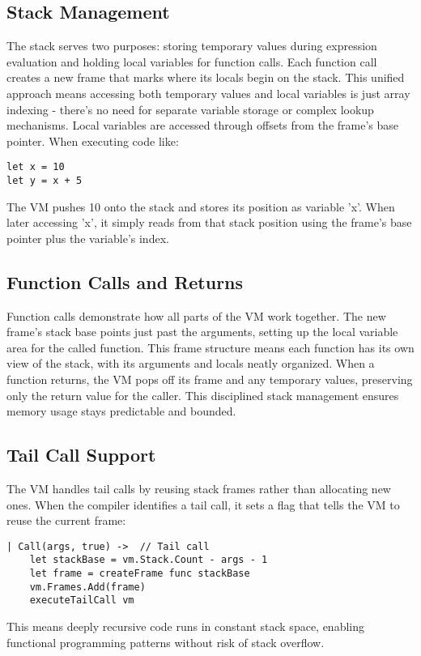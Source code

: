 \subsection{Stack Management}

The stack serves two purposes: storing temporary values during expression evaluation and holding local variables for function calls. Each function call creates a new frame that marks where its locals begin on the stack. This unified approach means accessing both temporary values and local variables is just array indexing - there's no need for separate variable storage or complex lookup mechanisms.
Local variables are accessed through offsets from the frame's base pointer. When executing code like:

\begin{verbatim}
let x = 10
let y = x + 5
\end{verbatim}

The VM pushes 10 onto the stack and stores its position as variable 'x'. When later accessing 'x', it simply reads from that stack position using the frame's base pointer plus the variable's index.

\subsection{Function Calls and Returns}

Function calls demonstrate how all parts of the VM work together. The new frame's stack base points just past the arguments, setting up the local variable area for the called function. 
This frame structure means each function has its own view of the stack, with its arguments and locals neatly organized. When a function returns, the VM pops off its frame and any temporary values, preserving only the return value for the caller. This disciplined stack management ensures memory usage stays predictable and bounded.

\subsection{Tail Call Support}

The VM handles tail calls by reusing stack frames rather than allocating new ones. When the compiler identifies a tail call, it sets a flag that tells the VM to reuse the current frame:

\begin{verbatim}
| Call(args, true) ->  // Tail call
    let stackBase = vm.Stack.Count - args - 1
    let frame = createFrame func stackBase
    vm.Frames.Add(frame)
    executeTailCall vm
\end{verbatim}
This means deeply recursive code runs in constant stack space, enabling functional programming patterns without risk of stack overflow.

